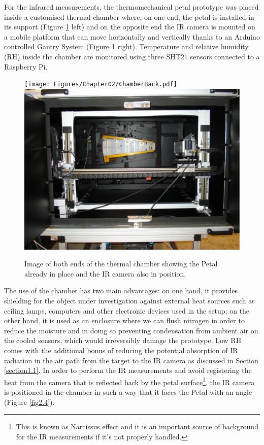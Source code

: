 		For the infrared measurements, the thermomechanical petal prototype was placed inside a customised thermal chamber where, on one end, the petal is installed in its support (Figure \ref{fig2.3} left) and on the opposite end the IR camera is mounted on a mobile platform that can move horizontally and vertically thanks to an Arduino controlled Gantry System (Figure \ref{fig2.3} right). Temperature and relative humidity (RH) inside the chamber are monitored using three SHT21 sensors connected  to a Raspberry Pi. 
		
		\begin{figure}[ht!]
			\centering
			\captionsetup{justification=centering,margin=2cm}
			\texttt{[image: Figures/Chapter02/ChamberBack.pdf]}
			\includegraphics[scale=0.26]{Figures/Chapter02/CamberFront.pdf}
			\caption{Image of both ends of the thermal chamber showing the Petal already in place and the IR camera also in position.}\label{fig2.3}
		\end{figure}
		
		The use of the chamber has two main advantages: on one hand, it provides shielding for the object under investigation against external heat sources such as ceiling lamps, computers and other electronic devices used in the setup; on the other hand, it is used as an enclosure where we can flush nitrogen in order to reduce the moisture and in doing so preventing condensation from ambient air on the cooled sensors, which would irreversibly damage the prototype. Low RH comes with the additional bonus of reducing the potential absorption of IR radiation in the air path from the target to the IR camera as discussed in Section \ref{section1.1}.
		In order to perform the IR measurements and avoid registering the heat from the camera that is reflected back by the petal surface\footnote{{\footnotesize This is known as Narcissus effect and it is an important source of background for the IR measurements if it’s not properly handled.}}, the IR camera is positioned in the chamber in such a way that it faces the Petal with an angle (Figure \ref{fig2.4}).	
		
